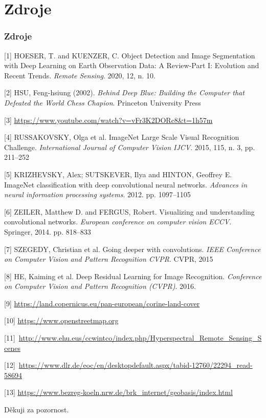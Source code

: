 \documentclass[10pt, t]{beamer}
\begin{document}

\section{Zdroje}

\begin{frame}

\frametitle{Zdroje}

\scriptsize{
[1] HOESER, T. and KUENZER, C. Object Detection and Image Segmentation with Deep Learning on Earth Observation Data: A Review-Part I: Evolution and Recent Trends. \textit{Remote Sensing}. 2020, 12, n. 10.

[2] HSU, Feng-hsiung (2002). \textit{Behind Deep Blue: Building the Computer that Defeated the World Chess Chapion}. Princeton University Press

[3] \url{https://www.youtube.com/watch?v=vFr3K2DORc8&t=1h57m}

[4] RUSSAKOVSKY, Olga et al. ImageNet Large Scale Visual Recognition Challenge. \textit{International Journal of Computer Vision IJCV}. 2015, 115, n. 3, pp. 211--252

[5] KRIZHEVSKY, Alex; SUTSKEVER, Ilya and HINTON, Geoffrey E. ImageNet classification with deep convolutional neural networks. \textit{Advances in neural information processing systems}. 2012. pp. 1097–1105

[6] ZEILER, Matthew D. and FERGUS, Robert. Visualizing and understanding convolutional networks. \textit{European conference on computer vision ECCV}. Springer, 2014. pp. 818–833

[7] SZEGEDY, Christian et al. Going deeper with convolutions. \textit{IEEE Conference on Computer Vision and Pattern Recognition CVPR}. CVPR, 2015

[8] HE, Kaiming et al. Deep Residual Learning for Image Recognition. \textit{Conference on Computer Vision and Pattern Recognition (CVPR)}. 2016.

[9] \url{https://land.copernicus.eu/pan-european/corine-land-cover}

[10] \url{https://www.openstreetmap.org}

[11]~\url{http://www.ehu.eus/ccwintco/index.php/Hyperspectral_Remote_Sensing_Scenes}

[12]~\url{https://www.dlr.de/eoc/en/desktopdefault.aspx/tabid-12760/22294_read-58694}

[13] \url{https://www.bezreg-koeln.nrw.de/brk_internet/geobasis/index.html}
}

\end{frame}


\begin{frame}[c]

\Huge{\centerline{Děkuji za pozornost.}}

\end{frame}

\end{document}
